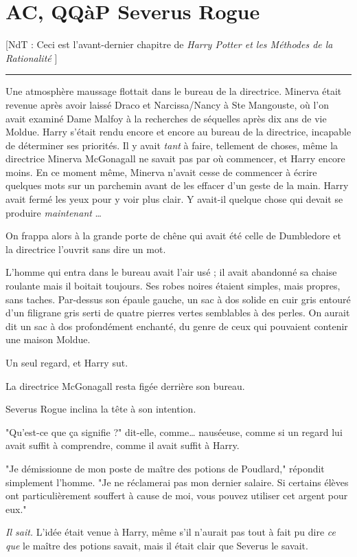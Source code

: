 
\chapter{AC, QQàP   Severus Rogue}

[NdT : Ceci est l'avant-dernier chapitre de \emph{Harry Potter et les Méthodes de la Rationalité} ]
\par\noindent\rule{\textwidth}{0.4pt}
Une atmosphère maussage flottait dans le bureau de la directrice. Minerva était revenue après avoir laissé Draco et Narcissa/Nancy à Ste Mangouste, où l'on avait examiné Dame Malfoy à la recherches de séquelles après dix ans de vie Moldue. Harry s'était rendu encore et encore au bureau de la directrice, incapable de déterminer ses priorités. Il y avait \emph{tant}  à faire, tellement de choses, même la directrice Minerva McGonagall ne savait pas par où commencer, et Harry encore moins. En ce moment même, Minerva n'avait cesse de commencer à écrire quelques mots sur un parchemin avant de les effacer d'un geste de la main. Harry avait fermé les yeux pour y voir plus clair. Y avait-il quelque chose qui devait se produire \emph{maintenant} …

On frappa alors à la grande porte de chêne qui avait été celle de Dumbledore et la directrice l'ouvrit sans dire un mot.

L'homme qui entra dans le bureau avait l'air usé ; il avait abandonné sa chaise roulante mais il boitait toujours. Ses robes noires étaient simples, mais propres, sans taches. Par-dessus son épaule gauche, un sac à dos solide en cuir gris entouré d'un filigrane gris serti de quatre pierres vertes semblables à des perles. On aurait dit un sac à dos profondément enchanté, du genre de ceux qui pouvaient contenir une maison Moldue.

Un seul regard, et Harry sut.

La directrice McGonagall resta figée derrière son bureau.

Severus Rogue inclina la tête à son intention.

"Qu'est-ce que ça signifie ?" dit-elle, comme… nauséeuse, comme si un regard lui avait suffit à comprendre, comme il avait suffit à Harry.

"Je démissionne de mon poste de maître des potions de Poudlard," répondit simplement l'homme. "Je ne réclamerai pas mon dernier salaire. Si certains élèves ont particulièrement souffert à cause de moi, vous pouvez utiliser cet argent pour eux."

\emph{Il sait.}  L'idée était venue à Harry, même s'il n'aurait pas tout à fait pu dire \emph{ce que}  le maître des potions savait, mais il était clair que Severus le savait.

